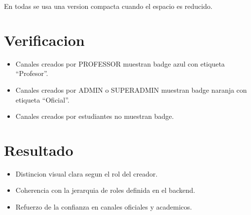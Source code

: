 En todas se usa una version compacta cuando el espacio es reducido.

\section{Verificacion}

\begin{itemize}[leftmargin=*]
  \item Canales creados por PROFESSOR muestran badge azul con etiqueta ``Profesor''.
  \item Canales creados por ADMIN o SUPERADMIN muestran badge naranja con etiqueta ``Oficial''.
  \item Canales creados por estudiantes no muestran badge.
\end{itemize}

\section{Resultado}

\begin{exito}
\begin{itemize}[leftmargin=*]
  \item Distincion visual clara segun el rol del creador.
  \item Coherencia con la jerarquia de roles definida en el backend.
  \item Refuerzo de la confianza en canales oficiales y academicos.
\end{itemize}
\end{exito}